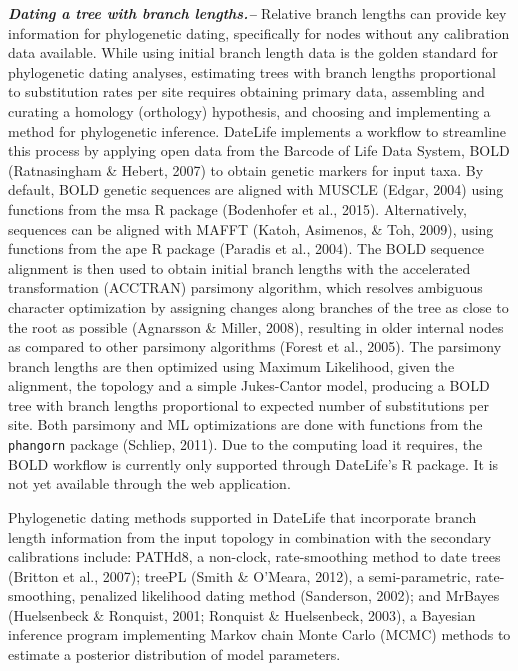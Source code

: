 \documentclass[english,man]{apa6}
\begin{document}
\textbf{\emph{Dating a tree with branch lengths.--}}
Relative branch lengths can provide key information for phylogenetic dating, specifically for nodes without any calibration data available.
While using initial branch length data is the golden standard for phylogenetic dating analyses, estimating trees with branch lengths proportional to substitution rates per site requires obtaining primary data, assembling and curating a homology (orthology) hypothesis, and choosing and implementing a method for phylogenetic inference.
DateLife implements a workflow to streamline this process by applying open data from the Barcode of Life Data System, BOLD (Ratnasingham \& Hebert, 2007) to obtain genetic markers for input taxa.
By default, BOLD genetic sequences are aligned with MUSCLE (Edgar, 2004) using functions from the msa R package (Bodenhofer et al., 2015). Alternatively, sequences can be aligned with MAFFT (Katoh, Asimenos, \& Toh, 2009), using functions from the ape R package (Paradis et al., 2004).
The BOLD sequence alignment is then used to obtain initial branch lengths with the accelerated transformation (ACCTRAN) parsimony algorithm, which resolves ambiguous character optimization by assigning changes along branches of the tree as close to the root as possible (Agnarsson \& Miller, 2008), resulting in older internal nodes as compared to other parsimony algorithms (Forest et al., 2005). The parsimony branch lengths are then optimized using Maximum Likelihood, given the alignment, the topology and a simple Jukes-Cantor model, producing a BOLD tree with branch lengths proportional to expected number of substitutions per site. Both parsimony and ML optimizations are done with functions from the \texttt{phangorn} package (Schliep, 2011).
Due to the computing load it requires, the BOLD workflow is currently only supported through DateLife's R package. It is not yet available through the web application.

Phylogenetic dating methods supported in DateLife that incorporate branch length information from the input topology in combination with the secondary calibrations include:
PATHd8, a non-clock, rate-smoothing method to date trees (Britton et al., 2007);
treePL (Smith \& O'Meara, 2012), a semi-parametric, rate-smoothing, penalized likelihood dating method (Sanderson, 2002);
and MrBayes (Huelsenbeck \& Ronquist, 2001; Ronquist \& Huelsenbeck, 2003), a Bayesian inference program implementing Markov chain Monte Carlo (MCMC) methods to estimate a posterior distribution of model parameters.
\end{document}
